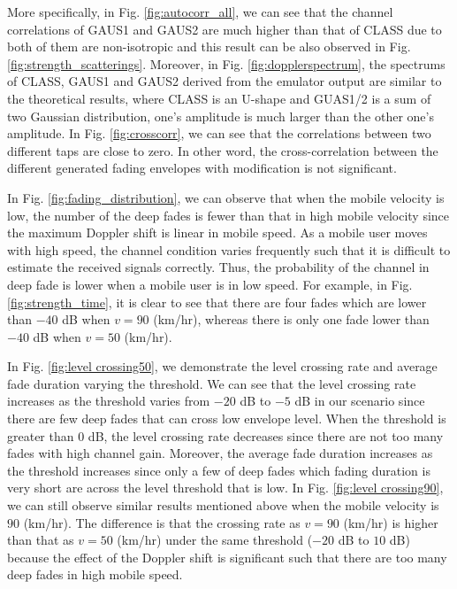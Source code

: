 \documentclass[12pt, draftclsnofoot, onecolumn]{IEEEtran}
\begin{document}
More specifically, in Fig. \ref{fig:autocorr_all}, we can see that the channel correlations of GAUS1 and GAUS2 are much higher than that of CLASS due to both of them are non-isotropic and this result can be also observed in Fig. \ref{fig:strength_scatterings}. Moreover, in Fig. \ref{fig:dopplerspectrum}, the spectrums of CLASS, GAUS1 and GAUS2 derived from the emulator output are similar to the theoretical results, where CLASS is an U-shape and GUAS1/2 is a sum of two Gaussian distribution, one's amplitude is much larger than the other one's amplitude. In Fig. \ref{fig:crosscorr}, we can see that the correlations between two different taps are close to zero. In other word, the cross-correlation between the different generated fading envelopes with modification is not significant.



In Fig. \ref{fig:fading_distribution}, we can observe that when the mobile velocity is low, the number of the deep fades is fewer than that in high mobile velocity since the maximum Doppler shift is linear in mobile speed. As a mobile user moves with high speed, the channel condition varies frequently such that it is difficult to estimate the received signals correctly. Thus, the probability of the channel in deep fade is lower when a mobile user is in low speed. For example, in Fig. \ref{fig:strength_time}, it is clear to see that there are four fades which are lower than $-40$ dB when $v = 90$ (km/hr), whereas there is only one fade lower than $-40$ dB when $v = 50$ (km/hr).



In Fig. \ref{fig:level crossing50}, we demonstrate the level crossing rate and average fade duration varying the threshold. We can see that the level crossing rate increases as the threshold varies from $-20$ dB to $-5$ dB in our scenario since there are few deep fades that can cross low envelope level. When the threshold is greater than $0$ dB, the level crossing rate decreases since there are not too many fades with high channel gain. Moreover, the average fade duration increases as the threshold increases since only a few of deep fades which fading duration is very short are across the level threshold that is low. In Fig. \ref{fig:level crossing90}, we can still observe similar results mentioned above when the mobile velocity is $90$ (km/hr). The difference is that the crossing rate as $v= 90$ (km/hr) is higher than that as $v=50$ (km/hr) under the same threshold ($-20$ dB to $10$ dB) because the effect of the Doppler shift is significant  such that there are too many deep fades in high mobile speed.
\end{document}
